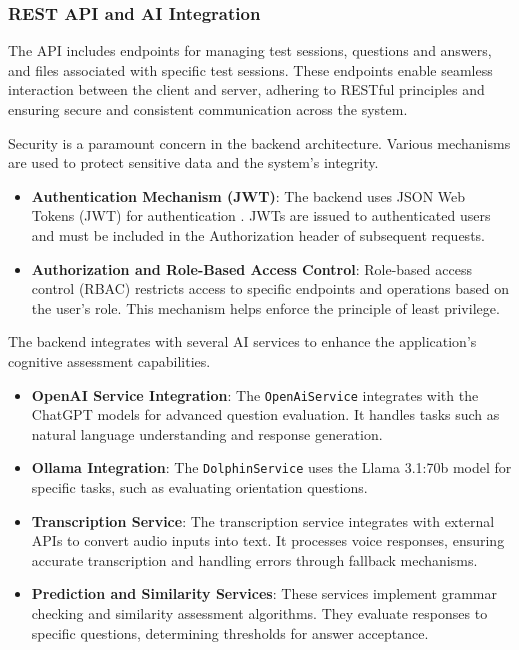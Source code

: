 \subsubsection{REST API and AI Integration}
The API includes endpoints for managing test sessions, questions and answers, and files associated with specific test sessions. These endpoints enable seamless interaction between the client and server, adhering to RESTful principles and ensuring secure and consistent communication across the system.

Security is a paramount concern in the backend architecture. Various mechanisms are used to protect sensitive data and the system's integrity.
\begin{itemize}
    \item \textbf{Authentication Mechanism (JWT)}: The backend uses JSON Web Tokens (JWT) for authentication \cite{Jones2015}. JWTs are issued to authenticated users and must be included in the Authorization header of subsequent requests.
    \item \textbf{Authorization and Role-Based Access Control}: Role-based access control (RBAC) restricts access to specific endpoints and operations based on the user's role. This mechanism helps enforce the principle of least privilege.
\end{itemize}

The backend integrates with several AI services to enhance the application's cognitive assessment capabilities.
\begin{itemize}
    \item \textbf{OpenAI Service Integration}: The \texttt{OpenAiService} integrates with the ChatGPT models for advanced question evaluation. It handles tasks such as natural language understanding and response generation.
    \item \textbf{Ollama Integration}: The \texttt{DolphinService} uses the Llama 3.1:70b model for specific tasks, such as evaluating orientation questions.
    \item \textbf{Transcription Service}: The transcription service integrates with external APIs to convert audio inputs into text. It processes voice responses, ensuring accurate transcription and handling errors through fallback mechanisms.
    \item \textbf{Prediction and Similarity Services}: These services implement grammar checking and similarity assessment algorithms. They evaluate responses to specific questions, determining thresholds for answer acceptance.
\end{itemize}

